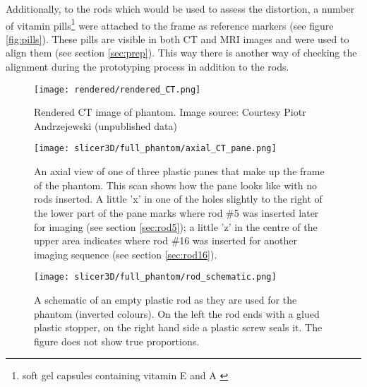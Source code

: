 Additionally, to the rods which would be used to assess the distortion, a number of vitamin pills\footnote{soft gel capsules containing vitamin E and A \cite{pillshere}} were attached to the frame as reference markers (see figure \ref{fig:pills}).
These pills are visible in both CT and MRI images and were used to align them (see section \ref{sec:prep}).
This way there is another way of checking the alignment during the prototyping process in addition to the rods.


\begin{figure}[!bp]
\centering
\texttt{[image: rendered/rendered\_CT.png]}
\caption{Rendered CT image of phantom. Image source: Courtesy Piotr Andrzejewski (unpublished data)}
\label{fig:rendered_CT}
\end{figure}


\begin{figure}[!tbp]
\centering
\texttt{[image: slicer3D/full\_phantom/axial\_CT\_pane.png]}
\caption[Axial view of one of three plastic panes that make up the frame of the phantom.]{An axial view of one of three plastic panes that make up the frame of the phantom. This scan shows how the pane looks like with no rods inserted. A little 'x' in one of the holes slightly to the right of the lower part of the pane marks where rod \#5 was inserted later for imaging (see section \ref{sec:rod5}); a little 'z' in the centre of the upper area indicates where rod \#16 was inserted for another imaging sequence (see section \ref{sec:rod16}).}
\label{fig:axial_CT_pane}
\end{figure}

\begin{figure}[!tbp]
\centering
\texttt{[image: slicer3D/full\_phantom/rod\_schematic.png]}
\caption[Schematic of an empty plastic rod]{A schematic of an empty plastic rod as they are used for the phantom (inverted colours). On the left the rod ends with a glued plastic stopper, on the right hand side a plastic screw seals it. The figure does not show true proportions.}
\label{fig:rod_schematic}
\end{figure}


